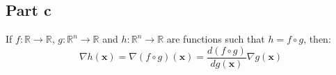 \documentclass{article}
\begin{document}
\subsection*{Part c}
\begin{flushleft}
If \(f : \mathbb{R} \to \mathbb{R}\), \(g : \mathbb{R}^{n} \to \mathbb{R}\) and \(h : \mathbb{R}^{n} \to \mathbb{R}\) are functions such that \(h = f \circ g\), then:
\begin{equation}
\nabla h(\mathbf{x}) = \nabla (f \circ g)(\mathbf{x}) = \frac{d(f \circ g)}{dg(\mathbf{x})} \nabla g(\mathbf{x})
\end{equation}
\end{flushleft}
\end{document}
